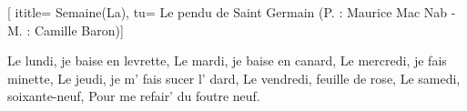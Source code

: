  [
ititle= {Semaine(La)},
tu= {Le pendu de Saint Germain (P. : Maurice Mac Nab - M. : Camille Baron)}]

\beginverse
Le lundi, je baise en levrette,
Le mardi, je baise en canard,
Le mercredi, je fais minette,
Le jeudi, je m' fais sucer l' dard,
Le vendredi, feuille de rose,
Le samedi, soixante-neuf,
 {Pour me refair' du foutre neuf.}
\endverse
\endsong